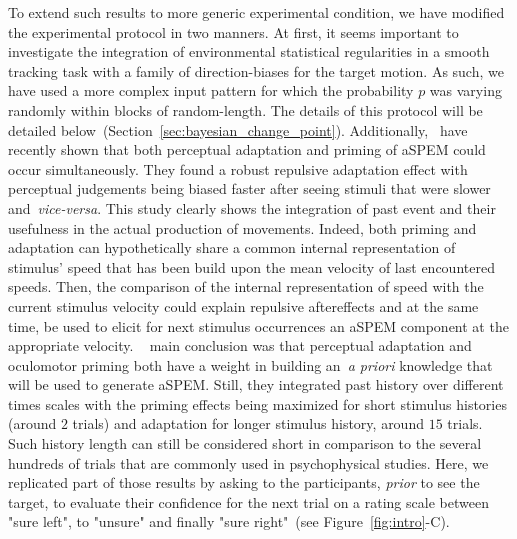 \documentclass[profile,final,english,draft]{article}%
\newcommand{\citet}[1]{\textcite{#1}}
\newcommand{\seeFig}[1]{Figure~\ref{fig:#1}}
\newcommand{\seeSec}[1]{Section~\ref{sec:#1}}
\begin{document}
To extend such results to more generic experimental condition,
we have modified the experimental protocol in two manners.
At first, it seems important to investigate the integration of environmental statistical regularities
in a smooth tracking task with
a family of direction-biases for the target motion.
As such, we have used a more complex input pattern
for which the probability $p$ was varying randomly
within blocks of random-length.
The details of this protocol will be detailed below~(\seeSec{bayesian_change_point}).
Additionally,~\citet{Maus2015} have recently shown that
both perceptual adaptation and priming of aSPEM could occur simultaneously.
They found a robust repulsive adaptation effect
with perceptual judgements being biased faster
after seeing stimuli that were slower and~\textit{vice-versa}.
This study clearly shows the integration of past event and
their usefulness in the actual production of movements.
Indeed, both priming and adaptation can hypothetically share
a common internal representation of stimulus' speed
that has been build upon the mean velocity of last encountered speeds.
Then, the comparison of the internal representation of speed
with the current stimulus velocity could explain repulsive aftereffects and
at the same time, be used to elicit for next stimulus occurrences
an aSPEM component at the appropriate velocity.
~\citet{Maus2015} main conclusion was that
perceptual adaptation and oculomotor priming
both have a weight in building an~\textit{a priori} knowledge
that will be used to generate aSPEM.
Still, they integrated past history over different times scales
with the priming effects being maximized
for short stimulus histories (around $2$ trials) and
adaptation for longer stimulus history, around $15$ trials.
Such history length can still be considered
short in comparison to the several hundreds
of trials that are commonly used in psychophysical studies.
Here, we replicated part of those results
by asking to the participants,
\emph{prior} to see the target,
to evaluate their confidence for the next trial on a rating scale
between "sure left", to "unsure" and finally "sure right"~(see \seeFig{intro}-C).
\end{document}
